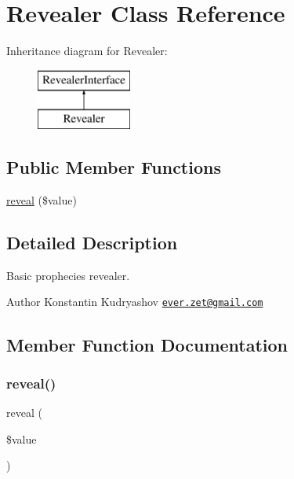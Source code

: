 \hypertarget{class_prophecy_1_1_prophecy_1_1_revealer}{}\section{Revealer Class Reference}
\label{class_prophecy_1_1_prophecy_1_1_revealer}
Inheritance diagram for Revealer\+:\begin{figure}[H]
\begin{center}
\leavevmode
\includegraphics[height=2.000000cm]{class_prophecy_1_1_prophecy_1_1_revealer}
\end{center}
\end{figure}
\subsection*{Public Member Functions}
\begin{DoxyCompactItemize}
\item 
\mbox{\hyperlink{class_prophecy_1_1_prophecy_1_1_revealer_a2164ede43027e2eff4dc1419222839f5}{reveal}} (\$value)
\end{DoxyCompactItemize}


\subsection{Detailed Description}
Basic prophecies revealer.

\begin{DoxyAuthor}{Author}
Konstantin Kudryashov \href{mailto:ever.zet@gmail.com}{\tt ever.\+zet@gmail.\+com} 
\end{DoxyAuthor}


\subsection{Member Function Documentation}
\mbox{\label{class_prophecy_1_1_prophecy_1_1_revealer_a2164ede43027e2eff4dc1419222839f5}} 
\subsubsection{\texorpdfstring{reveal()}{reveal()}}
{\footnotesize\ttfamily reveal (\begin{DoxyParamCaption}\item[{}]{\$value }\end{DoxyParamCaption})}

